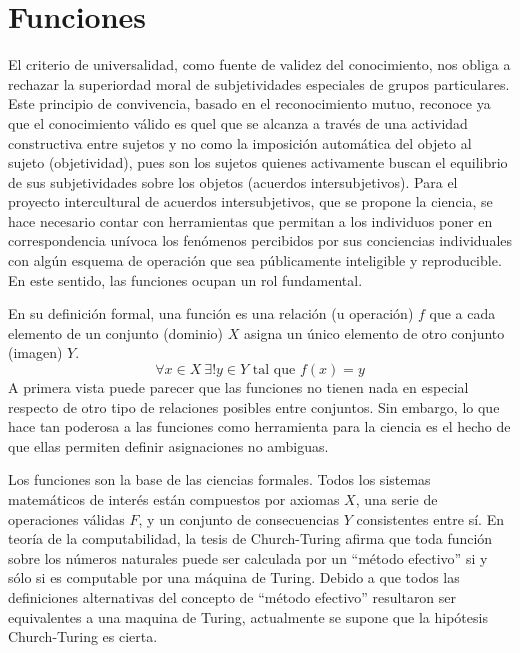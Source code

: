 \documentclass[a4paper,10pt]{book}
\begin{document}
\section{Funciones}

El criterio de universalidad, como fuente de validez del conocimiento, nos obliga a rechazar la superiordad moral de subjetividades especiales de grupos particulares.
Este principio de convivencia, basado en el reconocimiento mutuo, reconoce ya que el conocimiento válido es quel que se alcanza a través de una actividad constructiva entre sujetos y no como la imposición automática del objeto al sujeto (objetividad), pues son los sujetos quienes activamente buscan el equilibrio de sus subjetividades sobre los objetos (acuerdos intersubjetivos).
Para el proyecto intercultural de acuerdos intersubjetivos, que se propone la ciencia, se hace necesario contar con herramientas que permitan a los individuos poner en correspondencia unívoca los fenómenos percibidos por sus conciencias individuales con algún esquema de operación que sea públicamente inteligible y reproducible.
En este sentido, las funciones ocupan un rol fundamental.


En su definición formal, una función es una relación (u operación) $f$ que a cada elemento de un conjunto (dominio) $X$ asigna un único elemento de otro conjunto (imagen) $Y$.
%
\begin{equation}
 \forall x \in X \  \exists! y \in Y \text{ tal que } f(x) = y    
\end{equation}
%
A primera vista puede parecer que las funciones no tienen nada en especial respecto de otro tipo de relaciones posibles entre conjuntos.
Sin embargo, lo que hace tan poderosa a las funciones como herramienta para la ciencia es el hecho de que ellas permiten definir asignaciones no ambiguas.


Los funciones son la base de las ciencias formales.
Todos los sistemas matemáticos de interés están compuestos por axiomas $X$, una serie de operaciones válidas $F$, y un conjunto de consecuencias $Y$ consistentes entre sí.
En teoría de la computabilidad, la tesis de Church-Turing afirma que toda función sobre los números naturales puede ser calculada por un ``método efectivo'' si y sólo si es computable por una máquina de Turing.
Debido a que todos las definiciones alternativas del concepto  de ``método efectivo'' resultaron ser equivalentes a una maquina de Turing, actualmente se supone que la hipótesis Church-Turing es cierta.
\end{document}
